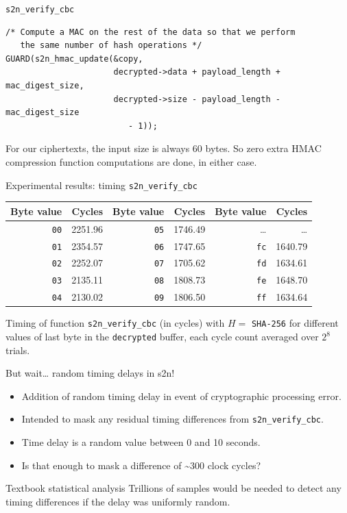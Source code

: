 \documentclass[presentation,smaller]{beamer}
\begin{document}
\begin{frame}[fragile,label={sec:orgheadline16}]{\texttt{s2n\_verify\_cbc}}
 \lstset{language=C,label= ,caption= ,captionpos=b,numbers=none}
\begin{lstlisting}
/* Compute a MAC on the rest of the data so that we perform
   the same number of hash operations */
GUARD(s2n_hmac_update(&copy,
                      decrypted->data + payload_length + mac_digest_size,
                      decrypted->size - payload_length - mac_digest_size
                         - 1));
\end{lstlisting}

\footnotesize For our ciphertexts, the input size is always 60 bytes. So \alert{zero} extra HMAC compression function computations are done, in either case.
\end{frame}

\begin{frame}[fragile,label={sec:orgheadline17}]{Experimental results: timing \texttt{s2n\_verify\_cbc}}
 \begin{center}
\begin{tabular}{rrrrrr}
Byte value & Cycles & Byte value & Cycles & Byte value & Cycles\\
\hline
\texttt{00} & 2251.96 & \texttt{05} & 1746.49 & … & …\\
\texttt{01} & 2354.57 & \texttt{06} & 1747.65 & \texttt{fc} & 1640.79\\
\texttt{02} & 2252.07 & \texttt{07} & 1705.62 & \texttt{fd} & 1634.61\\
\texttt{03} & 2135.11 & \texttt{08} & 1808.73 & \texttt{fe} & 1648.70\\
\texttt{04} & 2130.02 & \texttt{09} & 1806.50 & \texttt{ff} & 1634.64\\
\end{tabular}

\end{center}

Timing of function \texttt{s2n\_verify\_cbc} (in cycles) with \(H=\) \texttt{SHA-256} for different values of last byte in the \texttt{decrypted} buffer, each cycle count averaged over \(2^{8}\) trials.
\end{frame}

\begin{frame}[fragile,label={sec:orgheadline18}]{But wait… random timing delays in s2n!}
 \begin{itemize}
\item Addition of random timing delay in event of cryptographic processing error.
\item Intended to mask any residual timing differences from \texttt{s2n\_verify\_cbc}.
\item Time delay is a random value between 0 and 10 seconds.
\item Is that enough to mask a difference of \textasciitilde{}300 clock cycles?
\end{itemize}

\begin{block}{Textbook statistical analysis}
Trillions of samples would be needed to detect any timing differences if the delay was \alert{uniformly} random.
\end{block}
\end{frame}
\end{document}
